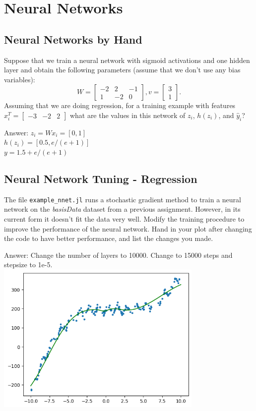 \documentclass{article}
\def\ans#1{\par\gre{Answer: #1}}
\def\blu#1{{\color{blu}#1}}
\def\gre#1{{\color{gre}#1}}
\newcommand{\mat}[1]{\begin{bmatrix}#1\end{bmatrix}}
\begin{document}
\section{Neural Networks}


\subsection{Neural Networks by Hand}

Suppose that we train a neural network with sigmoid activations and one hidden layer and obtain the following parameters (assume that we don't use any bias variables):
\[
W = \mat{-2 & 2 & -1\\1 & -2 & 0}, v = \mat{3 \\1}.
\]
Assuming that we are doing regression, \blu{for a training example with features $x_i^T = \mat{-3 &-2 & 2}$ what are the values in this network of $z_i$, $h(z_i)$, and $\hat{y}_i$?}
\ans{
    $z_i = Wx_i = [0, 1]$ \\
    $h(z_i) = [0.5, e/(e+1)]$ \\
    $y = 1.5 + e/(e+1)$
}
\subsection{Neural Network Tuning - Regression}

The file \texttt{example\_nnet.jl} runs a stochastic gradient method to train a neural network on the \emph{basisData} dataset from a previous assignment. However, in its current form it doesn't fit the data very well. Modify the training procedure to improve the performance of the neural network. \blu{Hand in your plot after changing the code to have better performance, and list the changes you made}.
\ans{
    Change the number of layers to 10000. Change to 15000 steps and stepsize to 1e-5.
    \\\includegraphics[width=10cm]{Q32.png}
    }
\end{document}
